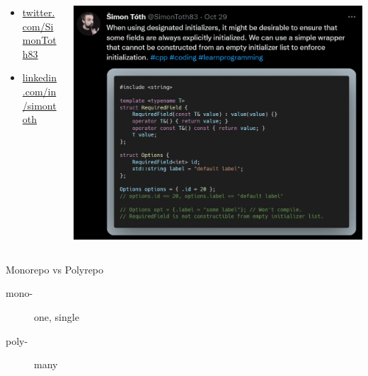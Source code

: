 \documentclass[aspectratio=169]{beamer}
\begin{document}
\begin{frame}{}
\begin{columns}
    \begin{column}{0.35\textwidth}
    \begin{itemize}
        \item \href{https://twitter.com/SimonToth83}{twitter.com/SimonToth83}
        \item \href{https://www.linkedin.com/in/simontoth}{linkedin.com/in/simontoth}
    \end{itemize}
    \end{column}
    \begin{column}{0.60\textwidth}
        \includegraphics[width=\textwidth]{static/tweet.png}
    \end{column}
\end{columns}
\end{frame}

\begin{frame}{}
\begin{center}
    \begin{Huge}
        Monorepo vs Polyrepo
    \end{Huge}
\end{center}
\end{frame}

\begin{frame}{}
\Huge
\begin{center}
\begin{description}
    \item[mono-] one, single \pause
    \item[poly-] many
\end{description}
\end{center}
\end{frame}
\end{document}

